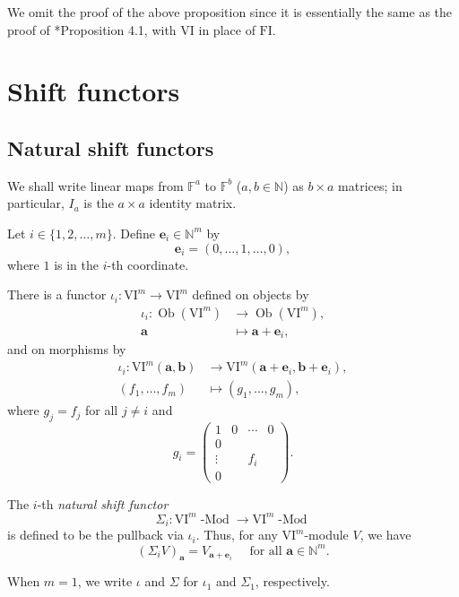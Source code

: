 \documentclass{amsart}
\numberwithin{equation}{section}
\DeclareMathOperator{\Mod}{-Mod}
\DeclareMathOperator{\Ob}{Ob}
\newcommand{\N}{{\mathbb{N}}}
\newcommand{\F}{{\mathbb{F}}}
\newcommand{\VI}{{\mathrm{VI}}}
\newcommand{\FI}{{\mathrm{FI}}}
\begin{document}
We omit the proof of the above proposition since it is essentially the same as the proof of \cite{gta}*{Proposition 4.1}, with $\VI$ in place of $\FI$.


\section{Shift functors} \label{sec: shift functors}

\subsection{Natural shift functors} \label{subsec:shift}
We shall write linear maps from $\F^a$ to $\F^b$ ($a,b\in\N$) as $b\times a$ matrices; in particular, $I_a$ is the $a\times a$ identity matrix. 

Let $i\in \{1, 2, \ldots, m\}$. Define $\mathbf{e}_i\in \N^m$ by 
\[ \mathbf{e}_i = (0, \ldots, 1, \ldots, 0), \]
where $1$ is in the $i$-th coordinate. 

There is a functor $\iota_i : \VI^m \to \VI^m$ defined on objects by 
\begin{align*} 
   \iota_i : \Ob(\VI^m) &\to \Ob(\VI^m), \\ 
   \mathbf{a} &\mapsto \mathbf{a}+\mathbf{e}_i,
\end{align*}
and on morphisms by
\begin{align*}
    \iota_i : \VI^m(\mathbf{a}, \mathbf{b}) &\to \VI^m(\mathbf{a}+\mathbf{e}_i, \mathbf{b}+\mathbf{e}_i), \\
     (f_1, \ldots, f_m) &\mapsto (g_1, \ldots, g_m), 
\end{align*}
where $g_j=f_j$ for all $j\neq i$ and
\[ g_i = \left( \begin{array}{c|ccc} 
   1 & 0 & \cdots & 0 \\
   \hline
   0 &   &        &   \\
   \vdots & & f_i &   \\
   0 &   &        &  
   \end{array} \right). \]

The $i$-th \emph{natural shift functor} 
\[ \Sigma_i : \VI^m\Mod \to \VI^m\Mod \]
is defined to be the pullback via $\iota_i$. Thus, for any $\VI^m$-module $V$, we have 
\[ (\Sigma_i V)_{\mathbf{a}} = V_{\mathbf{a}+\mathbf{e}_i} \quad\mbox{ for all } \mathbf{a}\in \N^m. \]


\begin{notation} \label{nota:iota}
   When $m=1$, we write $\iota$ and $\Sigma$ for $\iota_1$ and $\Sigma_1$, respectively.
\end{notation}
\end{document}
